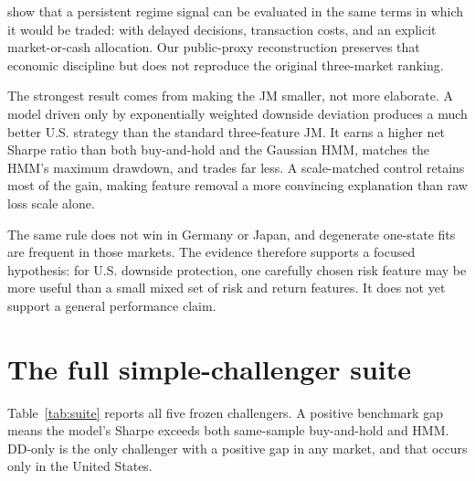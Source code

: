 \documentclass[11pt]{article}
\begin{document}
\citet{shu2024} show that a persistent regime signal can be evaluated in the same terms in which it would be traded: with delayed decisions, transaction costs, and an explicit market-or-cash allocation. Our public-proxy reconstruction preserves that economic discipline but does not reproduce the original three-market ranking.

The strongest result comes from making the JM smaller, not more elaborate. A model driven only by exponentially weighted downside deviation produces a much better U.S. strategy than the standard three-feature JM. It earns a higher net Sharpe ratio than both buy-and-hold and the Gaussian HMM, matches the HMM's maximum drawdown, and trades far less. A scale-matched control retains most of the gain, making feature removal a more convincing explanation than raw loss scale alone.

The same rule does not win in Germany or Japan, and degenerate one-state fits are frequent in those markets. The evidence therefore supports a focused hypothesis: for U.S. downside protection, one carefully chosen risk feature may be more useful than a small mixed set of risk and return features. It does not yet support a general performance claim.

\appendix

\section{The full simple-challenger suite}
\label{app:suite}

Table~\ref{tab:suite} reports all five frozen challengers. A positive benchmark gap means the model's Sharpe exceeds both same-sample buy-and-hold and HMM. DD-only is the only challenger with a positive gap in any market, and that occurs only in the United States.
\end{document}
